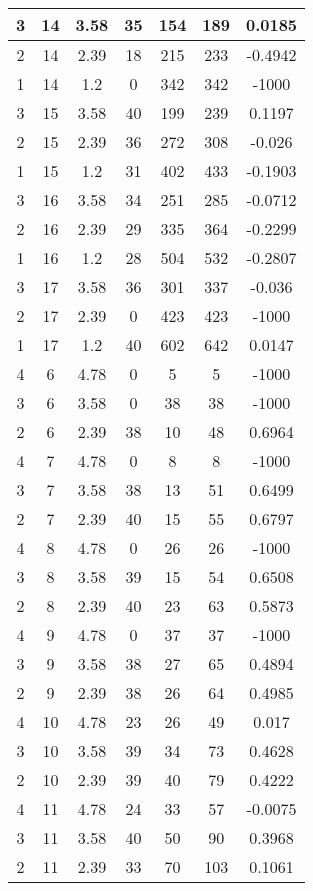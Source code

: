 \documentclass[letterpaper, 12pt]{article}
\begin{document}
\begin{longtable}{|c|c|c|c|c|c|c|}
\hline
3 & 14 & 3.58 & 35 & 154 & 189 & 0.0185 \\
\hline
2 & 14 & 2.39 & 18 & 215 & 233 & -0.4942 \\
\hline
1 & 14 & 1.2 & 0 & 342 & 342 & -1000 \\
\hline
3 & 15 & 3.58 & 40 & 199 & 239 & 0.1197 \\
\hline
2 & 15 & 2.39 & 36 & 272 & 308 & -0.026 \\
\hline
1 & 15 & 1.2 & 31 & 402 & 433 & -0.1903 \\
\hline
3 & 16 & 3.58 & 34 & 251 & 285 & -0.0712 \\
\hline
2 & 16 & 2.39 & 29 & 335 & 364 & -0.2299 \\
\hline
1 & 16 & 1.2 & 28 & 504 & 532 & -0.2807 \\
\hline
3 & 17 & 3.58 & 36 & 301 & 337 & -0.036 \\
\hline
2 & 17 & 2.39 & 0 & 423 & 423 & -1000 \\
\hline
1 & 17 & 1.2 & 40 & 602 & 642 & 0.0147 \\
\hline
4 & 6 & 4.78 & 0 & 5 & 5 & -1000 \\
\hline
3 & 6 & 3.58 & 0 & 38 & 38 & -1000 \\
\hline
2 & 6 & 2.39 & 38 & 10 & 48 & 0.6964 \\
\hline
4 & 7 & 4.78 & 0 & 8 & 8 & -1000 \\
\hline
3 & 7 & 3.58 & 38 & 13 & 51 & 0.6499 \\
\hline
2 & 7 & 2.39 & 40 & 15 & 55 & 0.6797 \\
\hline
4 & 8 & 4.78 & 0 & 26 & 26 & -1000 \\
\hline
3 & 8 & 3.58 & 39 & 15 & 54 & 0.6508 \\
\hline
2 & 8 & 2.39 & 40 & 23 & 63 & 0.5873 \\
\hline
4 & 9 & 4.78 & 0 & 37 & 37 & -1000 \\
\hline
3 & 9 & 3.58 & 38 & 27 & 65 & 0.4894 \\
\hline
2 & 9 & 2.39 & 38 & 26 & 64 & 0.4985 \\
\hline
4 & 10 & 4.78 & 23 & 26 & 49 & 0.017 \\
\hline
3 & 10 & 3.58 & 39 & 34 & 73 & 0.4628 \\
\hline
2 & 10 & 2.39 & 39 & 40 & 79 & 0.4222 \\
\hline
4 & 11 & 4.78 & 24 & 33 & 57 & -0.0075 \\
\hline
3 & 11 & 3.58 & 40 & 50 & 90 & 0.3968 \\
\hline
2 & 11 & 2.39 & 33 & 70 & 103 & 0.1061 \\

\end{longtable}
\end{document}
